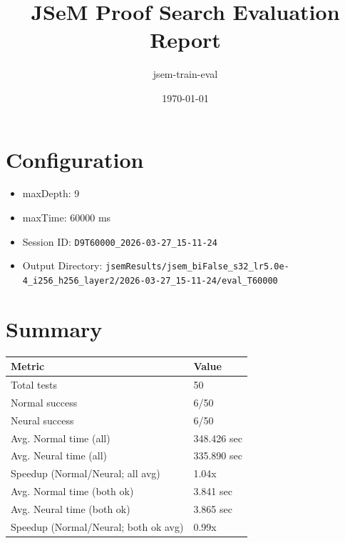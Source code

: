 \documentclass[a4paper,10pt]{article}
\title{JSeM Proof Search Evaluation Report}
\author{jsem-train-eval}
\date{\today}
\begin{document}
\maketitle

\section{Configuration}
\begin{itemize}
\item maxDepth: 9
\item maxTime: 60000 ms
\item Session ID: \texttt{D9T60000\_2026-03-27\_15-11-24}
\item Output Directory: \texttt{jsemResults/jsem\_biFalse\_s32\_lr5.0e-4\_i256\_h256\_layer2/2026-03-27\_15-11-24/eval\_T60000}
\end{itemize}

\section{Summary}
\begin{tabular}{ll}
\toprule
\textbf{Metric} & \textbf{Value} \\
\midrule
Total tests & 50 \\
Normal success & 6/50 \\
Neural success & 6/50 \\
\midrule
Avg. Normal time (all) & 348.426 sec \\
Avg. Neural time (all) & 335.890 sec \\
Speedup (Normal/Neural; all avg) & 1.04x \\
Avg. Normal time (both ok) & 3.841 sec \\
Avg. Neural time (both ok) & 3.865 sec \\
Speedup (Normal/Neural; both ok avg) & 0.99x \\
\bottomrule
\end{tabular}
\end{document}
